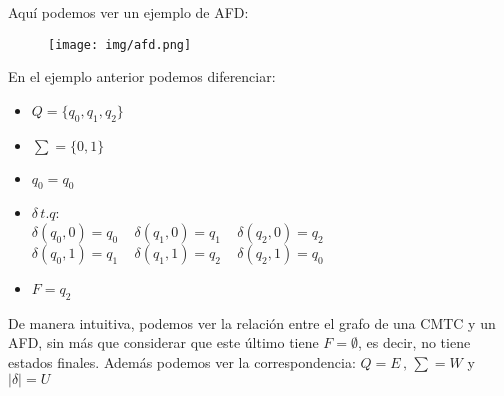 \documentclass{beamer}
\begin{document}
\begin{frame}
Aquí podemos ver un ejemplo de AFD:
\newline
\begin{figure}[h]
  \centering
    \texttt{[image: img/afd.png]}
  \label{fig:ejemplo}
\end{figure}
\end{frame}
\begin{frame}
En el ejemplo anterior podemos diferenciar:
\begin{itemize}
\item $Q=\{q_0,q_1,q_2 \}$
\item $\sum = \{0,1\}$
\item $q_0=q_0$
\item $\delta \, t.q$:
\\
$\delta(q_0,0)=q_0 \,\,\,\,\,\,\, \delta(q_1,0)=q_1\,\,\,\,\,\,\, \delta(q_2,0)=q_2$
\\
$\delta(q_0,1)=q_1 \,\,\,\,\,\,\,  \delta(q_1,1)=q_2 \,\,\,\,\,\,\,\delta(q_2,1)=q_0$
\item $F={q_2}$
\end{itemize}
\end{frame}
\begin{frame}
De manera intuitiva, podemos ver la relación entre el grafo de una CMTC y un AFD, sin más que considerar que este último tiene $F={\emptyset}$, es decir, no tiene estados finales.
\newline\newline
Además podemos ver la correspondencia: $Q=E\, ,\, \sum=W$ y $| \delta |=U$
\end{frame}
\end{document}
